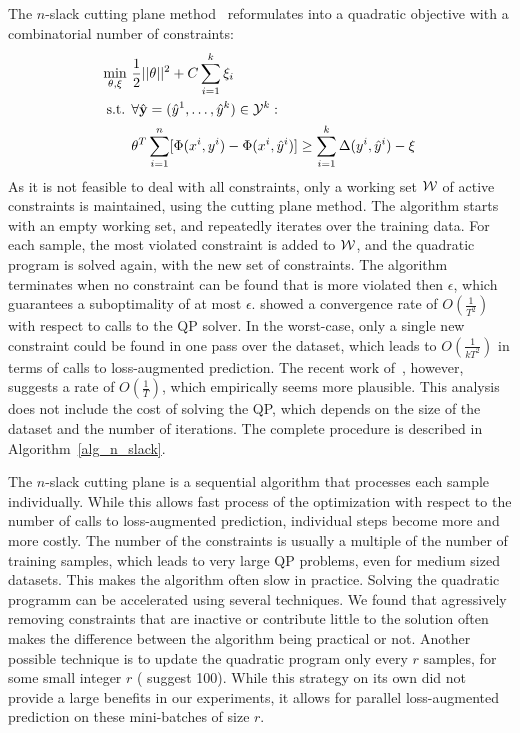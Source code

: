 The $n$-slack cutting plane method~\citep{tsochantaridis2006large} reformulates 
into a quadratic objective with a combinatorial number of constraints:
\begin{align}\label{eq:oneslack}
    \min_{\theta, \xi}\ &\frac{1}{2} ||\theta||^2 + C \sum_{i=1}^k \xi_i\\
    \text{s.t. }&\forall \hat{\mathbf{y}}=(\hat{y}^{1}, \dots, \hat{y}^{k}) \in \mathcal{Y}^k:\\
    &\theta^T \sum_{i=1}^n [\Phi(x^{i}, y^{i}) - \Phi(x^{i},
        \hat{y}^{i})] \geq \sum_{i=1}^k \Delta(y^{i}, \hat{y}^{i})
            - \xi
\end{align}
As it is not feasible to deal with all constraints, only a working set $\mathcal{W}$ of active constraints
is maintained, using the cutting plane method. The algorithm starts with an empty working set,
and repeatedly iterates over the training data. For each sample, the most
violated constraint is added to $\mathcal{W}$, and the quadratic program is solved
again, with the new set of constraints.
The algorithm terminates when no constraint can be found that is more violated then $\epsilon$,
which guarantees a suboptimality of at most $\epsilon$.
%
\citet{tsochantaridis2006large} showed a convergence rate of $O(\frac{1}{T^2})$
with respect to calls to the QP solver. In the worst-case, only a single new constraint
could be found in one pass over the dataset, which leads to $O(\frac{1}{kT^2})$ in terms
of calls to loss-augmented prediction. The recent work
of~\citet{lacoste2012block}, however, suggests a rate of $O(\frac{1}{T})$,
which empirically seems more plausible. This analysis does not include the cost
of solving the QP, which depends on the size of the dataset and the number of
iterations. 
The complete procedure is described in Algorithm~\ref{alg_n_slack}.

The $n$-slack cutting plane is a sequential algorithm that processes each sample
individually. While this allows fast process of the optimization with respect
to the number of calls to loss-augmented prediction, individual steps
become more and more costly. The number of the constraints is usually a
multiple of the number of training  samples, which leads to very large QP
problems, even for medium sized datasets. This makes the algorithm often slow
in practice.
%
Solving the quadratic programm can be accelerated using several techniques. We
found that agressively removing constraints that are inactive or contribute
little to the solution often makes the difference between the algorithm being
practical or not.  Another possible technique is to update the quadratic
program only every $r$ samples, for some small integer $r$
(\citet{joachims2009cutting} suggest 100). While this strategy on its own did
not provide a large benefits in our experiments, it allows for parallel
loss-augmented prediction on these mini-batches of size $r$.


